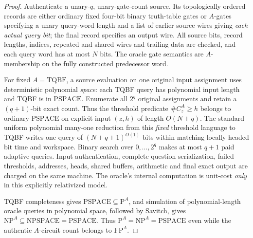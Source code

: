 \documentclass[11pt]{article}
\begin{document}
\begin{proof}
Authenticate a unary-$q$, unary-gate-count source. Its topologically
ordered records are either ordinary fixed four-bit binary truth-table
gates or $A$-gates specifying a unary query-word length and a list of
earlier source wires giving \emph{each actual query bit}; the final
record specifies an output wire. All source bits, record lengths,
indices, repeated and shared wires and trailing data are checked,
and each query word has at most $N$ bits. The oracle gate semantics
are $A$-membership on the fully constructed predecessor word.

For fixed $A=\mathrm{TQBF}$, a source evaluation on one original
input assignment uses deterministic polynomial \emph{space}:
each TQBF query has polynomial input length and TQBF is in
$\mathrm{PSPACE}$. Enumerate all $2^q$ original assignments and
retain a $(q+1)$-bit exact count. Thus the threshold predicate
$\#C_z^A\ge h$ belongs to ordinary $\mathrm{PSPACE}$ on explicit
input $(z,h)$ of length $O(N+q)$. The standard uniform polynomial
many-one reduction from this \emph{fixed} threshold language
to TQBF writes one query of $(N+q+1)^{O(1)}$ bits within matching
locally headed bit time and workspace. Binary search over
$0,\ldots,2^q$ makes at most $q+1$ paid adaptive queries.
Input authentication, complete question serialization, failed
thresholds, addresses, heads, shared buffers, arithmetic and
final exact output are charged on the same machine.
The oracle's internal computation is unit-cost \emph{only}
in this explicitly relativized model.

TQBF completeness gives $\mathrm{PSPACE}\subseteq\mathrm P^A$,
and simulation of polynomial-length oracle queries in polynomial
space, followed by Savitch, gives
$\mathrm{NP}^A\subseteq\mathrm{NPSPACE}=\mathrm{PSPACE}$.
Thus $\mathrm P^A=\mathrm{NP}^A=\mathrm{PSPACE}$ even while
the authentic $A$-circuit count belongs to $\mathrm{FP}^A$.
\end{proof}
\end{document}

